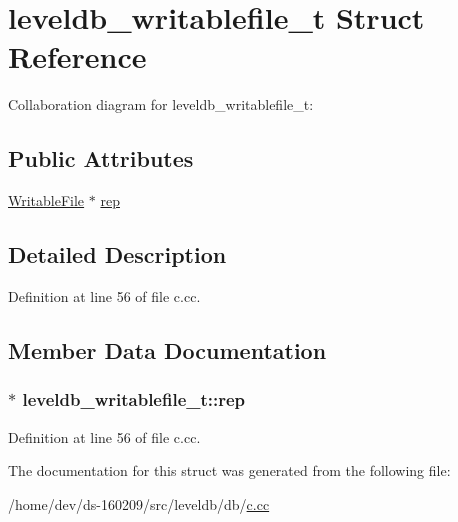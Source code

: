 \hypertarget{structleveldb__writablefile__t}{}\section{leveldb\+\_\+writablefile\+\_\+t Struct Reference}
\label{structleveldb__writablefile__t}


Collaboration diagram for leveldb\+\_\+writablefile\+\_\+t\+:
\subsection*{Public Attributes}
\begin{DoxyCompactItemize}
\item 
\hyperlink{classleveldb_1_1_writable_file}{Writable\+File} $\ast$ \hyperlink{structleveldb__writablefile__t_a3cf7e2a9ac0560d667deee9d574d7761}{rep}
\end{DoxyCompactItemize}


\subsection{Detailed Description}


Definition at line 56 of file c.\+cc.



\subsection{Member Data Documentation}
\hypertarget{structleveldb__writablefile__t_a3cf7e2a9ac0560d667deee9d574d7761}{}
\subsubsection[{rep}]{$\ast$ leveldb\+\_\+writablefile\+\_\+t\+::rep}\label{structleveldb__writablefile__t_a3cf7e2a9ac0560d667deee9d574d7761}


Definition at line 56 of file c.\+cc.



The documentation for this struct was generated from the following file\+:\begin{DoxyCompactItemize}
\item 
/home/dev/ds-\/160209/src/leveldb/db/\hyperlink{c_8cc}{c.\+cc}\end{DoxyCompactItemize}
